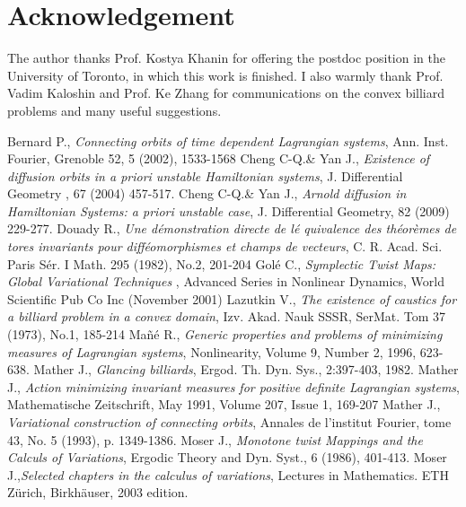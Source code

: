 \documentclass{amsart}
\begin{document}
\section*{Acknowledgement}
The author thanks Prof. Kostya Khanin for offering the postdoc position in the University of Toronto, in which this work is finished. I also warmly thank Prof. Vadim Kaloshin and Prof. Ke Zhang for communications on the convex billiard problems and many useful suggestions.
\begin{thebibliography}{9999}
 Bernard P., {\it Connecting orbits of time dependent Lagrangian systems}, Ann. Inst. Fourier, Grenoble 52, 5 (2002), 1533-1568
 Cheng C-Q.\& Yan J., {\it Existence of diffusion orbits in a priori unstable Hamiltonian systems}, J. Differential Geometry , 67 (2004) 457-517.
 Cheng C-Q.\& Yan J., {\it Arnold diffusion in Hamiltonian Systems: a priori unstable case}, J. Differential Geometry, 82 (2009) 229-277.
 Douady R., {\it Une d\'emonstration directe de l\'e quivalence des th\'eor\`emes de tores invariants pour diff\'eomorphismes et champs de vecteurs}, C. R. Acad. Sci. Paris S\'er. I Math. 295 (1982), No.2, 201-204
 Gol\'e C., {\it Symplectic Twist Maps: Global Variational Techniques }, Advanced Series in Nonlinear Dynamics, World Scientific Pub Co Inc (November 2001)
 Lazutkin V., {\it The existence of caustics for a billiard problem in a convex domain}, Izv. Akad. Nauk SSSR, SerMat. Tom 37 (1973), No.1, 185-214
 Ma\~{n}\'e R., {\it Generic properties and problems of minimizing measures of Lagrangian systems}, Nonlinearity, Volume 9, Number 2, 1996, 623-638.
 Mather J., {\it Glancing billiards}, Ergod. Th. Dyn. Sys., 2:397-403, 1982.
 Mather J., {\it Action minimizing invariant measures for positive definite Lagrangian systems}, Mathematische Zeitschrift, May 1991, Volume 207, Issue 1, 169-207
 Mather J., {\it Variational construction of connecting orbits}, Annales de l'institut Fourier, tome 43, No. 5 (1993), p. 1349-1386.
 Moser J., {\it Monotone twist Mappings and the Calculs of Variations}, Ergodic Theory and Dyn. Syst., 6 (1986), 401-413.
 Moser J.,{\it Selected chapters in the calculus of variations}, Lectures in Mathematics. ETH Z\"urich, Birkh\"auser, 2003 edition.
\end{thebibliography}
\end{document}

